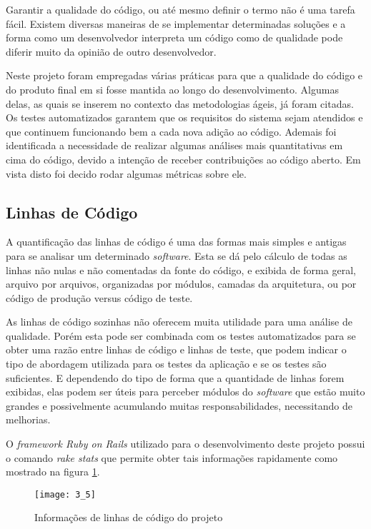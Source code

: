 Garantir a qualidade do código, ou até mesmo definir o termo não é uma tarefa fácil. Existem diversas maneiras de se implementar determinadas soluções e a forma como um desenvolvedor interpreta um código como de qualidade pode diferir muito da opinião de outro desenvolvedor.

Neste projeto foram empregadas várias práticas para que a qualidade do código e do produto final em si fosse mantida ao longo do desenvolvimento. Algumas delas, as quais se inserem no contexto das metodologias ágeis, já foram citadas. Os testes automatizados garantem que os requisitos do sistema sejam atendidos e que continuem funcionando bem a cada nova adição ao código. Ademais foi identificada a necessidade de realizar algumas análises mais quantitativas em cima do código, devido a intenção de receber contribuições ao código aberto. Em vista disto foi decido rodar algumas métricas sobre ele.

\subsection{Linhas de Código}

A quantificação das linhas de código é uma das formas mais simples e antigas para se analisar um determinado \textit{software}. Esta se dá pelo cálculo de todas as linhas não nulas e não comentadas da fonte do código, e exibida de forma geral, arquivo por arquivos, organizadas por módulos, camadas da arquitetura, ou por código de produção versus código de teste.

As linhas de código sozinhas não oferecem muita utilidade para uma análise de qualidade. Porém esta pode ser combinada com os testes automatizados para se obter uma razão entre linhas de código e linhas de teste, que podem indicar o tipo de abordagem utilizada para os testes da aplicação e se os testes são suficientes. E dependendo do tipo de forma que a quantidade de linhas forem exibidas, elas podem ser úteis para perceber módulos do \textit{software} que estão muito grandes e possivelmente acumulando muitas responsabilidades, necessitando de melhorias.

O \textit{framework Ruby on Rails} utilizado para o desenvolvimento deste projeto possui o comando \textit{rake stats} que permite obter tais informações rapidamente como mostrado na figura \ref{figura5}.

\begin{figure}[H]
    \centering
\texttt{[image: 3\_5]}
    \caption{Informações de linhas de código do projeto}
    \label{figura5}
\end{figure}

